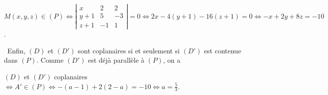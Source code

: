 {{\begin{center}
$M(x,y,z)\in(P)\Leftrightarrow
\left|
\begin{array}{ccc}
x&2&2\\
y+1&5&-3\\
z+1&-1&1
\end{array}\right|=0\Leftrightarrow 2x-4(y+1)-16(z+1)=0\Leftrightarrow-x+2y+8z=-10$.
\end{center}
\textbullet~Enfin, $(D)$ et $(D')$ sont coplanaires si et seulement si $(D')$ est contenue dans $(P)$. Comme $(D')$ est déjà parallèle à $(P)$, on a

\begin{center}
$(D)$ et $(D')$ coplanaires $\Leftrightarrow A'\in(P)\Leftrightarrow-(a-1)+2(2-a)=-10\Leftrightarrow a=\frac{5}{3}$.
\end{center}

\begin{center}
\end{center}
}
}
